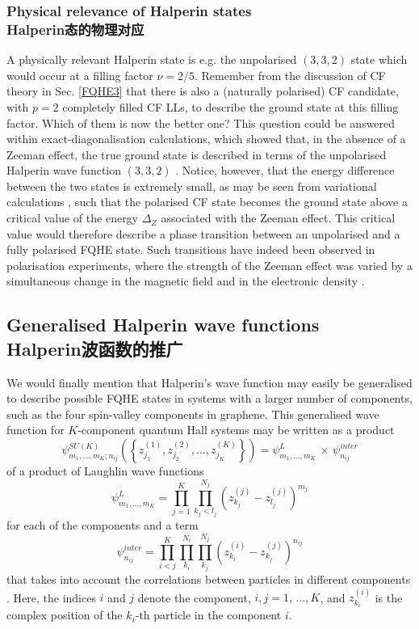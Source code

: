 \documentclass[10pt]{book}
\newcommand{\beq}{\begin{equation}}
\newcommand{\eeq}{\end{equation}}
\begin{document}
\subsubsection[Halperin态的物理对应]{Physical relevance of Halperin states\\\bf Halperin态的物理对应}

A physically relevant Halperin state is e.g. the unpolarised $(3,3,2)$ state which would occur at a filling factor $\nu=2/5$. 
Remember from the discussion of CF theory in Sec. \ref{FQHE3} that there is also a (naturally polarised) CF candidate, with
$p=2$ completely filled CF LLs, to describe the ground state at this filling factor. Which of them is now the better one? This question
could be answered within exact-diagonalisation calculations, which showed that, in the absence of a Zeeman effect, the
true ground state is described in terms of the unpolarised Halperin wave function $(3,3,2)$ \cite{CZ}. Notice, 
however, that the energy difference between the two states is extremely small, as may be seen from variational calculations
\cite{JainBook}, such that the polarised CF state becomes the ground state above a critical value of the energy $\Delta_Z$
associated with the Zeeman effect. This critical value would therefore describe a phase transition between an unpolarised 
and a fully polarised FQHE state. Such transitions have indeed been observed in polarisation experiments, where the strength
of the Zeeman effect was varied by a simultaneous change in the magnetic field and in the electronic density \cite{kang,kukush}.




\subsection[Halperin波函数的推广]{Generalised Halperin wave functions\\\bf Halperin波函数的推广}

We would finally mention that Halperin's wave function may easily be generalised to describe possible FQHE states in systems with
a larger number of components, such as the four spin-valley components in graphene.
This generalised wave function for $K$-component quantum Hall systems may be written as a product
\beq\label{HalperinGen}
\psi_{m_1,...,m_K;n_{ij}}^{SU(K)}\left(\left\{z_{j_1}^{(1)},z_{j_2}^{(2)}, ...,z_{j_K}^{(K)}
\right\}\right)
=\psi_{m_1,...,m_K}^L \,\times\,\psi_{n_{ij}}^{inter} 
\eeq
of a product of Laughlin wave functions
$$
\psi_{m_1,...,m_K}^L=\prod_{j=1}^K\prod_{k_j<l_j}^{N_j}\left(
z_{k_j}^{(j)}-z_{l_j}^{(j)}\right)^{m_j}
$$
for each of the components and a term
$$
\psi_{n_{ij}}^{inter}=\prod_{i<j}^{K}\prod_{k_i}^{N_i}\prod_{k_j}^{N_j}
\left(z_{k_i}^{(i)}-z_{k_j}^{(j)}\right)^{n_{ij}}
$$
that takes into account the correlations between particles in different components \cite{GR}. Here, 
the indices $i$ and $j$ denote the component, $i,j=1,\, ...,K$, and $z_{k_i}^{(i)}$ is the complex
position of the $k_i$-th particle in the component $i$. 
\end{document}
